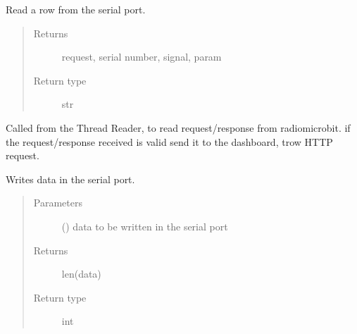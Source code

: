\documentclass[letterpaper,10pt,english]{sphinxmanual}
\begin{document}

\begin{fulllineitems}
\label{\detokenize{index:threads.read_serial}}
Read a row from the serial port.
\begin{quote}\begin{description}
\item[{Returns}] \leavevmode
request, serial number, signal, param

\item[{Return type}] \leavevmode
str

\end{description}\end{quote}

\end{fulllineitems}


\begin{fulllineitems}
\label{\detokenize{index:threads.reader}}
Called from the Thread Reader, to read request/response from radio\sphinxhyphen{}microbit.
if the request/response received is valid send it to the dashboard,
trow HTTP request.

\end{fulllineitems}


\begin{fulllineitems}
\label{\detokenize{index:threads.write_serial}}
Writes data in the serial port.
\begin{quote}\begin{description}
\item[{Parameters}] \leavevmode
{} () \textendash{} data to be written in the serial port

\item[{Returns}] \leavevmode
len(data)

\item[{Return type}] \leavevmode
int

\end{description}\end{quote}

\end{fulllineitems}
\end{document}
